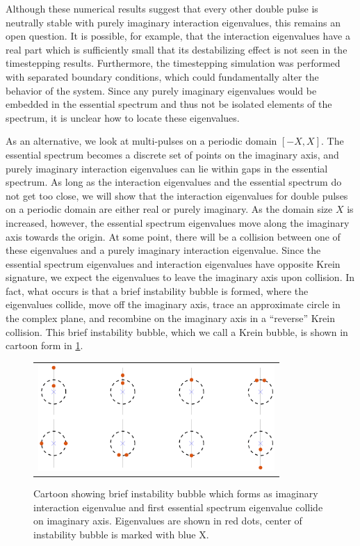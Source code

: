 \documentclass[10pt,reqno]{amsart}
\theoremstyle{plain}
\theoremstyle{definition}
\theoremstyle{remark}
\numberwithin{theorem}{section}
\numberwithin{equation}{section}
\begin{document}
Although these numerical results suggest that every other double pulse is neutrally stable with purely imaginary interaction eigenvalues, this remains an open question. It is possible, for example, that the interaction eigenvalues have a real part which is sufficiently small that its destabilizing effect is not seen in the timestepping results. Furthermore, the timestepping simulation was performed with separated boundary conditions, which could fundamentally alter the behavior of the system. Since any purely imaginary eigenvalues would be embedded in the essential spectrum and thus not be isolated elements of the spectrum, it is unclear how to locate these eigenvalues.

As an alternative, we look at multi-pulses on a periodic domain $[-X, X]$. The essential spectrum becomes a discrete set of points on the imaginary axis, and purely imaginary interaction eigenvalues can lie within gaps in the essential spectrum. As long as the interaction eigenvalues and the essential spectrum do not get too close, we will show that the interaction eigenvalues for double pulses on a periodic domain are either real or purely imaginary. As the domain size $X$ is increased, however, the essential spectrum eigenvalues move along the imaginary axis towards the origin. At some point, there will be a collision between one of these eigenvalues and a purely imaginary interaction eigenvalue. Since the essential spectrum eigenvalues and interaction eigenvalues have opposite Krein signature, we expect the eigenvalues to leave the imaginary axis upon collision. In fact, what occurs is that a brief instability bubble is formed, where the eigenvalues collide, move off the imaginary axis, trace an approximate circle in the complex plane, and recombine on the imaginary axis in a ``reverse'' Krein collision. This brief instability bubble, which we call a Krein bubble, is shown in cartoon form in \cref{fig:KreinBubbleCartoon}.
\begin{figure}[H]
\begin{center}
\begin{tabular}{c}
\includegraphics[width=9cm]{images/KreinBubbleCartoon.eps}
\end{tabular}
\end{center}
\caption{Cartoon showing brief instability bubble which forms as imaginary interaction eigenvalue and first essential spectrum eigenvalue collide on imaginary axis. Eigenvalues are shown in red dots, center of instability bubble is marked with blue X.}
\label{fig:KreinBubbleCartoon}
\end{figure}
\end{document}

